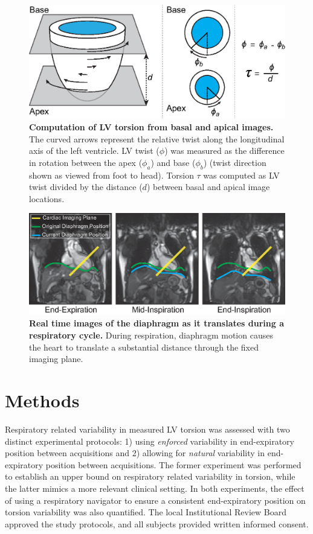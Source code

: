	\begin{figure} 
		\includegraphics{figures/torsionpaper/Fig1-LVtorsion}
		\caption[Computation of LV torsion from basal and apical images]{\textbf{Computation of LV torsion from basal and apical images.} The curved arrows represent the relative twist along the longitudinal axis of the left ventricle. LV twist ($\phi$) was measured as the difference in rotation between the apex ($\phi_a$) and base ($\phi_b$) (twist direction shown as viewed from foot to head). Torsion $\tau$ was computed as LV twist divided by the distance ($d$) between basal and apical image locations.}
		\label{fig:lvtorsion}
	\end{figure}
	
	\begin{figure}
		\includegraphics{figures/torsionpaper/Fig2-range_of_diaphragm_position_breathing}
		\caption[Real time images of the diaphragm as it translates during a respiratory cycle]{\textbf{Real time images of the diaphragm as it translates during a respiratory cycle.} During respiration, diaphragm motion causes the heart to translate a substantial distance through the fixed imaging plane.}
		\label{fig:diaphragmtranslation}
	\end{figure}

\section{Methods}
	Respiratory related variability in measured LV torsion was assessed with two distinct experimental protocols: 1) using \textit{enforced} variability in end-expiratory position between acquisitions and 2) allowing for \textit{natural} variability in end-expiratory position between acquisitions. The former experiment was performed to establish an upper bound on respiratory related variability in torsion, while the latter mimics a more relevant clinical setting. In both experiments, the effect of using a respiratory navigator to ensure a consistent end-expiratory position on torsion variability was also quantified. The local Institutional Review Board approved the study protocols, and all subjects provided written informed consent.

